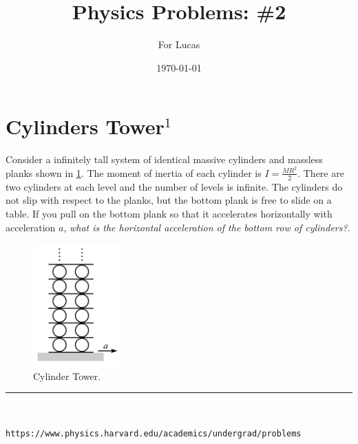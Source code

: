 \documentclass{article}
\begin{document}
\title{Physics Problems: \#2}

\author{For Lucas}

\date{\today}
\maketitle


\section*{Cylinders Tower$^1$}

Consider a infinitely tall system of identical massive cylinders and massless planks shown in \ref{fig:tower}. The moment of inertia of each cylinder is $I = \frac{MR^2}{2}$. There are two cylinders at each level and the number of levels is infinite. The cylinders do not slip with respect to the planks, but the bottom plank is free to slide on a table. If you pull on the bottom plank so that it accelerates horizontally with acceleration $a$, \textit{what is the horizontal acceleration of the bottom row of cylinders?}.\\

\begin{figure}[h!]
\begin{center}
\includegraphics[width=0.3\textwidth]{tower.png}
\end{center}
\caption{Cylinder Tower.}
\label{fig:tower}
\end{figure}


\vspace{2mm}

\begin{center}
\noindent\rule{8cm}{0.4pt}\\
\end{center}

\noindent [1] \texttt{https://www.physics.harvard.edu/academics/undergrad/problems}
\end{document}
